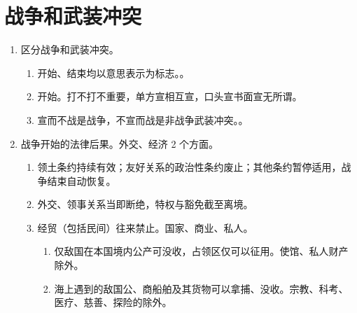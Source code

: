 \section{战争和武装冲突}
\begin{enumerate}
  \item 区分战争和武装冲突。
        \begin{enumerate}
          \item 开始、结束均以意思表示为标志。。
          \item 开始。打不打不重要，单方宣相互宣，口头宣书面宣无所谓。
          \item 宣而不战是战争，不宣而战是非战争武装冲突。。
        \end{enumerate}
  \item 战争开始的法律后果。外交、经济 2 个方面。
        \begin{enumerate}
          \item 领土条约持续有效；友好关系的政治性条约废止；其他条约暂停适用，战争结束自动恢复。
          \item 外交、领事关系当即断绝，特权与豁免截至离境。
          \item 经贸（包括民间）往来禁止。国家、商业、私人。
                \begin{enumerate}
                  \item 仅敌国在本国境内公产可没收，占领区仅可以征用。使馆、私人财产除外。
                  \item 海上遇到的敌国公、商船舶及其货物可以拿捕、没收。宗教、科考、医疗、慈善、探险的除外。
                \end{enumerate}
        \end{enumerate}


\end{enumerate}
